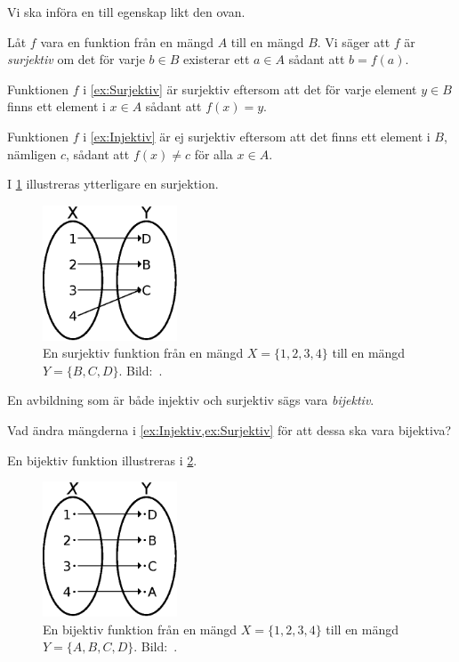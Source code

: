 Vi ska införa en till egenskap likt den ovan.
\begin{definition}\label{def:Surjektiv}
  Låt \(f\) vara en funktion från en mängd \(A\) till en mängd \(B\).
  Vi säger att \(f\) är \emph{surjektiv} om det för varje \(b\in B\)
  existerar ett \(a\in A\) sådant att \(b=f(a)\).
\end{definition}
\begin{example}
  Funktionen \(f\) i \cref{ex:Surjektiv} är surjektiv eftersom att
  det för varje element \(y\in B\) finns ett element i \(x\in A\) sådant
  att \(f(x)=y\).
\end{example}
\begin{example}
  Funktionen \(f\) i \cref{ex:Injektiv} är ej surjektiv eftersom att
  det finns ett element i \(B\), nämligen \(c\), sådant att
  \(f(x)\neq c\) för alla \(x\in A\).
\end{example}

I \cref{fig:Surjektion} illustreras ytterligare en surjektion.
\begin{figure}
  \includegraphics[width=4cm]{figs/surjection.eps}
  \caption{%
    En surjektiv funktion från en mängd \(X=\{1,2,3,4\}\) till en
    mängd \(Y=\{B,C,D\}\).
    Bild:~\cite{Wikipedia2013Injection}.
  }\label{fig:Surjektion}
\end{figure}

\begin{definition}
  En avbildning som är både injektiv och surjektiv sägs vara
  \emph{bijektiv}.
\end{definition}
\begin{exercise}
  Vad ändra mängderna i \cref{ex:Injektiv,ex:Surjektiv} för att dessa ska vara 
  bijektiva?
\end{exercise}

En bijektiv funktion illustreras i \cref{fig:Bijektion}.
\begin{figure}
  \includegraphics[width=4cm]{figs/bijection.eps}
  \caption{%
    En bijektiv funktion från en mängd \(X=\{1,2,3,4\}\) till en
    mängd \(Y=\{A,B,C,D\}\).
    Bild:~\cite{Wikipedia2013Injection}.
  }\label{fig:Bijektion}
\end{figure}


